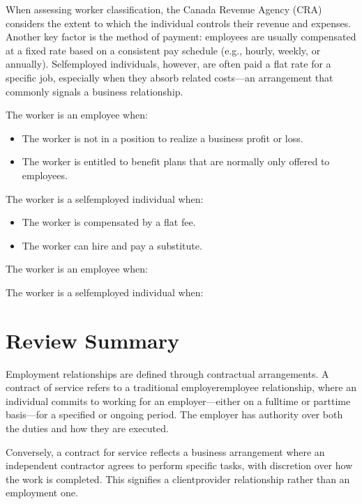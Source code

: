 \documentclass[letterpaper,10pt,english]{sphinxmanual}
\begin{document}
\sphinxAtStartPar
When assessing worker classification, the Canada Revenue Agency (CRA) considers the extent to which the individual controls
their revenue and expenses. Another key factor is the method of payment: employees are usually compensated at a fixed rate
based on a consistent pay schedule (e.g., hourly, weekly, or annually). Self\sphinxhyphen{}employed individuals, however, are often paid a
flat rate for a specific job, especially when they absorb related costs—an arrangement that commonly signals a business
relationship.

\sphinxAtStartPar
The worker is an employee when:
\begin{itemize}
\item {} 
\sphinxAtStartPar
The worker is not in a position to realize a business profit or loss.

\item {} 
\sphinxAtStartPar
The worker is entitled to benefit plans that are normally only offered to employees.

\end{itemize}

\sphinxAtStartPar
The worker is a self\sphinxhyphen{}employed individual when:
\begin{itemize}
\item {} 
\sphinxAtStartPar
The worker is compensated by a flat fee.

\item {} 
\sphinxAtStartPar
The worker can hire and pay a substitute.

\end{itemize}

\sphinxAtStartPar
The worker is an employee when:

\sphinxAtStartPar
The worker is a self\sphinxhyphen{}employed individual when:


\section{Review Summary}
\label{\detokenize{3_contracts:review-summary}}
\sphinxAtStartPar
Employment relationships are defined through contractual arrangements. A contract of service refers to a traditional
employer\sphinxhyphen{}employee relationship, where an individual commits to working for an employer—either on a full\sphinxhyphen{}time or part\sphinxhyphen{}time
basis—for a specified or ongoing period. The employer has authority over both the duties and how they are executed.

\sphinxAtStartPar
Conversely, a contract for service reflects a business arrangement where an independent contractor agrees to perform specific
tasks, with discretion over how the work is completed. This signifies a client\sphinxhyphen{}provider relationship rather than an employment
one.
\end{document}
